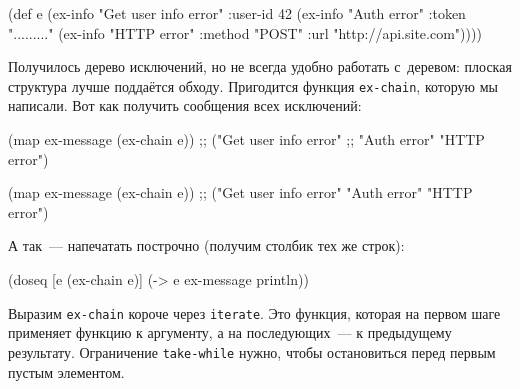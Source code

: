 \else

\begin{english}
  \begin{clojure}
(def e
  (ex-info
   "Get user info error"
   {:user-id 42}
   (ex-info "Auth error"
            {:token "........."}
            (ex-info "HTTP error"
                     {:method "POST"
                      :url "http://api.site.com"}))))
  \end{clojure}
\end{english}

\fi


Получилось дерево исключений, но не всегда удобно работать с~деревом: плоская
структура лучше поддаётся обходу. Пригодится функция \verb|ex-chain|, которую мы
написали. Вот как получить сообщения всех исключений:

\ifnarrow

\begin{english}
  \begin{clojure}
(map ex-message (ex-chain e))
;; ("Get user info error"
;;  "Auth error" "HTTP error")
  \end{clojure}
\end{english}

\else

\begin{english}
  \begin{clojure}
(map ex-message (ex-chain e))
;; ("Get user info error" "Auth error" "HTTP error")
  \end{clojure}
\end{english}

\fi

\noindent
А так~--- напечатать построчно (получим столбик тех же строк):


\begin{english}
  \begin{clojure}
(doseq [e (ex-chain e)]
  (-> e ex-message println))
  \end{clojure}
\end{english}

Выразим \verb|ex-chain| короче через \verb|iterate|. Это функция, которая на
первом шаге применяет функцию к аргументу, а на последующих~--- к предыдущему
результату. Ограничение \verb|take-while| нужно, чтобы остановиться перед первым
пустым элементом.

\ifnarrow

